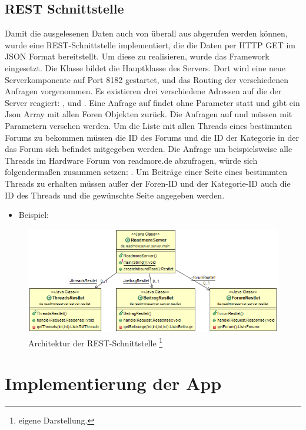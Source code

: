 \subsection{REST Schnittstelle}
Damit die ausgelesenen Daten auch von überall aus abgerufen werden können, wurde
eine REST-Schnittstelle implementiert, die die Daten per HTTP GET im
JSON Format bereitstellt. Um diese zu realisieren, wurde das Framework
 eingesetzt. Die Klasse  bildet die
Hauptklasse des Servers. Dort wird eine neue Serverkomponente auf Port 8182
gestartet, und das Routing der verschiedenen Anfragen vorgenommen. Es existieren
drei verschiedene Adressen auf die der Server reagiert: ,
 und . Eine Anfrage auf  findet ohne
Parameter statt und gibt ein Json Array mit allen Foren Objekten zurück. Die
Anfragen auf  und  müssen mit Parametern versehen
werden. Um die Liste mit allen Threads eines bestimmten Forums zu bekommen
müssen die ID des Forums und die ID der Kategorie in der das Forum sich befindet
mitgegeben werden. Die Anfrage um beispielsweise alle Threads im Hardware Forum
von readmore.de abzufragen, würde sich folgendermaßen zusammen setzen:
.
Um Beiträge einer Seite eines bestimmten Threads zu erhalten müssen außer der
Foren-ID und der Kategorie-ID auch die ID des Threads und die gewünschte Seite
angegeben werden.
\begin{itemize}
  \item Beispiel: 
\end{itemize}
\begin{figure}[!htbp]
\centering
\includegraphics[width=\textwidth]{Bilder/server.png}
\caption[Architektur der REST-Schnittstelle]{Architektur der REST-Schnittstelle \protect\footnote{eigene Darstellung.} }
\label{dminfo}
\end{figure}

\section{Implementierung der App}